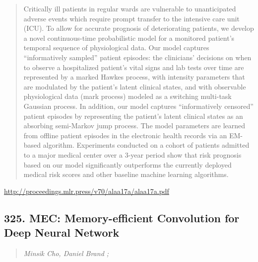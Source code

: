 \documentclass{article}
\begin{document}
\begin{quote}
    Critically ill patients in regular wards are vulnerable to unanticipated adverse events which require prompt transfer to the intensive care unit (ICU). To allow for accurate prognosis of deteriorating patients, we develop a novel continuous-time probabilistic model for a monitored patient’s temporal sequence of physiological data. Our model captures “informatively sampled” patient episodes: the clinicians’ decisions on when to observe a hospitalized patient’s vital signs and lab tests over time are represented by a marked Hawkes process, with intensity parameters that are modulated by the patient’s latent clinical states, and with observable physiological data (mark process) modeled as a switching multi-task Gaussian process. In addition, our model captures “informatively censored” patient episodes by representing the patient’s latent clinical states as an absorbing semi-Markov jump process. The model parameters are learned from offline patient episodes in the electronic health records via an EM-based algorithm. Experiments conducted on a cohort of patients admitted to a major medical center over a 3-year period show that risk prognosis based on our model significantly outperforms the currently deployed medical risk scores and other baseline machine learning algorithms.  
\end{quote}

\href{http://proceedings.mlr.press/v70/alaa17a/alaa17a.pdf}{http://proceedings.mlr.press/v70/alaa17a/alaa17a.pdf}

\subsection{325. MEC: Memory-efficient Convolution for Deep Neural Network}

\begin{quote}
\footnotesize{\textit{Minsik Cho, Daniel Brand ;}}

\end{quote}
\end{document}

